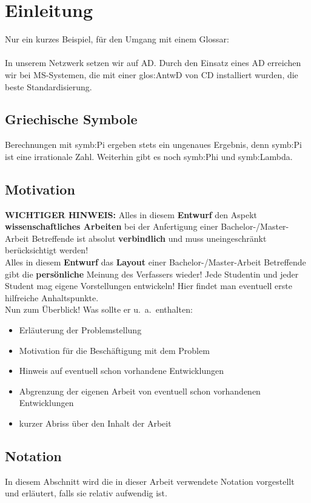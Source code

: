 \chapter{Einleitung}
\label{chap:einleitung}
Nur ein kurzes Beispiel, für den Umgang mit einem Glossar:
\\\\
In unserem Netzwerk setzen wir auf \gls{AD}. Durch den Einsatz
eines \gls{AD} erreichen wir bei \gls{MS}-Systemen, die mit einer
\gls{glos:AntwD} von \gls{CD} installiert wurden, die beste Standardisierung.

\section{Griechische Symbole}
Berechnungen mit \gls{symb:Pi} ergeben stets ein ungenaues Ergebnis,
denn \gls{symb:Pi} ist eine irrationale Zahl. Weiterhin gibt es noch
\gls{symb:Phi} und \gls{symb:Lambda}.

\section{Motivation}
{\bf WICHTIGER HINWEIS:} 
Alles in diesem {\bf Entwurf} den Aspekt
{\bf wissenschaftliches Arbeiten} bei der Anfertigung einer
Bachelor-/Master-Arbeit 
Betreffende ist absolut {\bf verbindlich} und muss uneingeschränkt
berücksichtigt werden! \\[0.1cm]
Alles in diesem {\bf Entwurf} das 
{\bf Layout} einer Bachelor-/Master-Arbeit Betreffende gibt die 
{\bf persönliche} Meinung des 
Verfassers wieder! Jede Studentin und jeder Student mag eigene Vorstellungen
entwickeln! Hier findet man eventuell erste hilfreiche Anhaltspunkte. \\[0.1cm]
Nun zum Überblick! Was sollte er u.\ a.\ enthalten:
\begin{itemize}
\itemsep -6pt
\item Erläuterung der Problemstellung 
\item Motivation für die Beschäftigung mit dem Problem
\item Hinweis auf eventuell schon vorhandene Entwicklungen 
\item Abgrenzung der eigenen Arbeit von eventuell schon vorhandenen
      Entwicklungen 
\item kurzer Abriss über den Inhalt der Arbeit
\end{itemize}

\section{Notation}
In diesem Abschnitt wird die in dieser Arbeit verwendete Notation 
vorgestellt und erläutert, falls sie relativ aufwendig ist.

